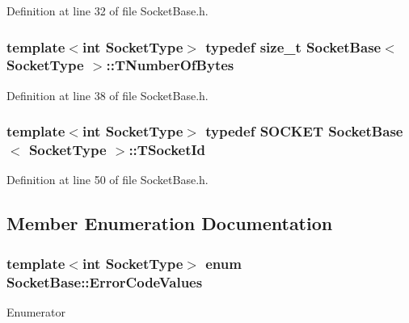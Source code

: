 Definition at line 32 of file Socket\-Base.\-h.

\hypertarget{class_socket_base_ac414903631491453b96e71c06c2c2e72}{
\subsubsection[{T\-Number\-Of\-Bytes}]{\setlength{\rightskip}{0pt plus 5cm}template$<$int Socket\-Type$>$ typedef size\-\_\-t {\bf Socket\-Base}$<$ Socket\-Type $>$\-::{\bf T\-Number\-Of\-Bytes}}}\label{class_socket_base_ac414903631491453b96e71c06c2c2e72}


Definition at line 38 of file Socket\-Base.\-h.

\hypertarget{class_socket_base_aad53265037e46768af4d6a0c2ebed277}{
\subsubsection[{T\-Socket\-Id}]{\setlength{\rightskip}{0pt plus 5cm}template$<$int Socket\-Type$>$ typedef {\bf S\-O\-C\-K\-E\-T} {\bf Socket\-Base}$<$ Socket\-Type $>$\-::{\bf T\-Socket\-Id}\hspace{0.3cm}{\ttfamily [protected]}}}\label{class_socket_base_aad53265037e46768af4d6a0c2ebed277}


Definition at line 50 of file Socket\-Base.\-h.



\subsection{Member Enumeration Documentation}
\hypertarget{class_socket_base_abb6e8769e1c9168c1ff7423fe7933d30}{
\subsubsection[{Error\-Code\-Values}]{\setlength{\rightskip}{0pt plus 5cm}template$<$int Socket\-Type$>$ enum {\bf Socket\-Base\-::\-Error\-Code\-Values}}}\label{class_socket_base_abb6e8769e1c9168c1ff7423fe7933d30}
\begin{Desc}
\item[Enumerator]\par
\begin{description}
\item[{\em 
\hypertarget{class_socket_base_abb6e8769e1c9168c1ff7423fe7933d30a01138908e891529174d30941d3014bdc}{No\-Error}\label{class_socket_base_abb6e8769e1c9168c1ff7423fe7933d30a01138908e891529174d30941d3014bdc}
}]\end{description}
\end{Desc}


